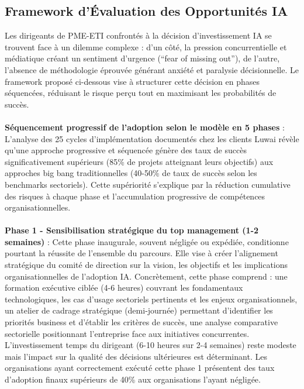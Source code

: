 \subsection{Framework d'Évaluation des Opportunités IA}

Les dirigeants de PME-ETI confrontés à la décision d'investissement IA se trouvent face à un dilemme complexe : d'un côté, la pression concurrentielle et médiatique créant un sentiment d'urgence (\enquote{fear of missing out}), de l'autre, l'absence de méthodologie éprouvée générant anxiété et paralysie décisionnelle. Le framework proposé ci-dessous vise à structurer cette décision en phases séquencées, réduisant le risque perçu tout en maximisant les probabilités de succès.
\\\\
\textbf{Séquencement progressif de l'adoption selon le modèle en 5 phases} : L'analyse des 25 cycles d'implémentation documentés chez les clients Luwai révèle qu'une approche progressive et séquencée génère des taux de succès significativement supérieurs (85\% de projets atteignant leurs objectifs) aux approches big bang traditionnelles (40-50\% de taux de succès selon les benchmarks sectoriels). Cette supériorité s'explique par la réduction cumulative des risques à chaque phase et l'accumulation progressive de compétences organisationnelles.
\\\\
\textbf{Phase 1 - Sensibilisation stratégique du top management (1-2 semaines)} : Cette phase inaugurale, souvent négligée ou expédiée, conditionne pourtant la réussite de l'ensemble du parcours. Elle vise à créer l'alignement stratégique du comité de direction sur la vision, les objectifs et les implications organisationnelles de l'adoption IA. Concrètement, cette phase comprend : une formation exécutive ciblée (4-6 heures) couvrant les fondamentaux technologiques, les cas d'usage sectoriels pertinents et les enjeux organisationnels, un atelier de cadrage stratégique (demi-journée) permettant d'identifier les priorités business et d'établir les critères de succès, une analyse comparative sectorielle positionnant l'entreprise face aux initiatives concurrentes. L'investissement temps du dirigeant (6-10 heures sur 2-4 semaines) reste modeste mais l'impact sur la qualité des décisions ultérieures est déterminant. Les organisations ayant correctement exécuté cette phase 1 présentent des taux d'adoption finaux supérieurs de 40\% aux organisations l'ayant négligée.
\\\\
